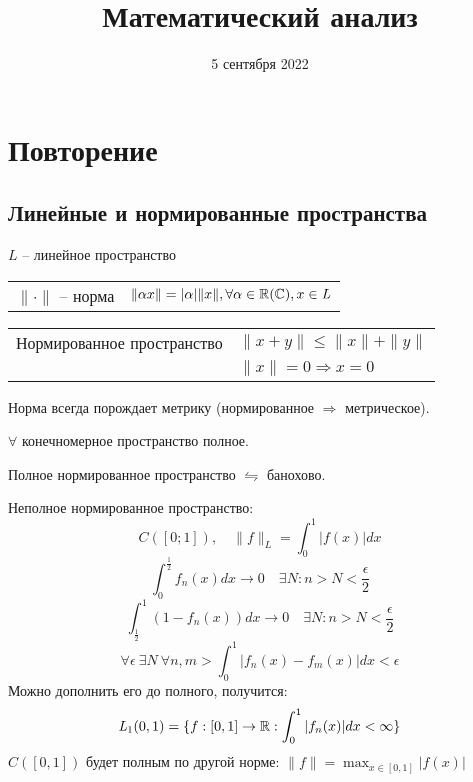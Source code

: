 


    
    \title{Математический анализ}
    \date{5 сентября 2022}
    \maketitle{}

    \pagebreak
    \section*{Повторение}
    \subsection*{Линейные и нормированные пространства}
    
    $\mathit{L}$ -- линейное пространство
    \newline
    \par
    \begin{tabularx}{\textwidth}{X l}
        $\| \cdot \|$ -- норма & $\| \alpha x \| = |\alpha| \| x \|, \forall \alpha \in \mathbb{R} (\mathbb{C}), x \in \mathit L$
    \end{tabularx}
    \newline
    \par
    \begin{tabularx}{\textwidth}{X l}
        Нормированное пространство & $\| x + y \| \le \| x \| + \| y \|$ \\
        & $\| x \| = 0 \Rightarrow x = 0$ \\
    \end{tabularx}

    \begin{remark}
        Норма всегда порождает метрику (нормированное $\Rightarrow$ метрическое).
    \end{remark}

    \begin{remark}
        $\forall$ конечномерное пространство полное.
    \end{remark}

    \begin{definition}
        Полное нормированное пространство $\leftrightharpoons$ банохово.
    \end{definition}

    \begin{illustration}
        Неполное нормированное пространство:
        \[
            C([0; 1]), \quad \| f \|_L = \int_0^1 |f(x)| dx
        \]
        \[
            \int_0^\frac12 f_n(x) dx \rightarrow 0 \quad \exists N: n > N < \frac \epsilon 2
        \]
        \[
            \int_\frac12^1 (1 - f_n(x)) dx \rightarrow 0 \quad \exists N: n > N < \frac \epsilon 2
        \]
        \[
            \forall \epsilon \ \exists N \ \forall n, m > \int_0^1 |f_n(x) - f_m(x)| dx < \epsilon   
        \]
        Можно дополнить его до полного, получится:
        \[
            \mathit{L}_1(0, 1) = \{ f : [0, 1] \rightarrow \mathbb{R} : \int_0^1 |f_n(x)| dx < \infty \}    
        \]
        $C([0,1])$ будет полным по другой норме: $\| f \| = \max_{x\in[0,1]} |f(x)|$
    \end{illustration}

